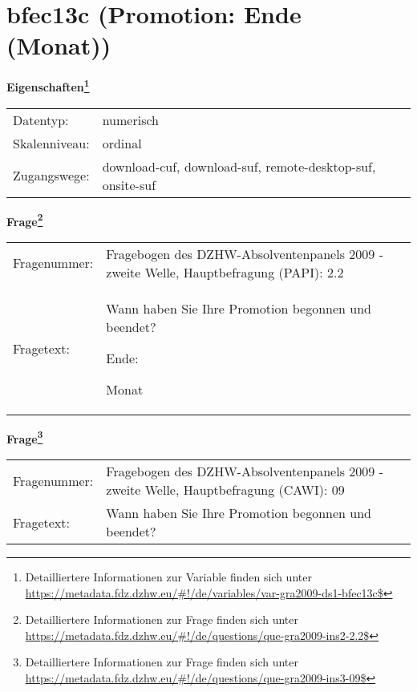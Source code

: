 
    \setcounter{footnote}{0}

    \vspace*{-1.8cm}
	\section{bfec13c (Promotion: Ende (Monat))}
	\label{section:bfec13c}



    \vspace*{0.5cm}
    \noindent\textbf{Eigenschaften\footnote{Detailliertere Informationen zur Variable finden sich unter
		\url{https://metadata.fdz.dzhw.eu/\#!/de/variables/var-gra2009-ds1-bfec13c$}}}\\
	\begin{tabularx}{\hsize}{@{}lX}
	Datentyp: & numerisch \\
	Skalenniveau: & ordinal \\
	Zugangswege: &
	  download-cuf, 
	  download-suf, 
	  remote-desktop-suf, 
	  onsite-suf
 \\
    \end{tabularx}



				\vspace*{0.5cm}
                \noindent\textbf{Frage\footnote{Detailliertere Informationen zur Frage finden sich unter
		              \url{https://metadata.fdz.dzhw.eu/\#!/de/questions/que-gra2009-ins2-2.2$}}}\\
				\begin{tabularx}{\hsize}{@{}lX}
					Fragenummer: &
					  Fragebogen des DZHW-Absolventenpanels 2009 - zweite Welle, Hauptbefragung (PAPI):
					  2.2
 \\
					Fragetext: & Wann haben Sie Ihre Promotion begonnen und beendet?\par  Ende:\par  Monat \\
				\end{tabularx}
				\vspace*{0.5cm}
                \noindent\textbf{Frage\footnote{Detailliertere Informationen zur Frage finden sich unter
		              \url{https://metadata.fdz.dzhw.eu/\#!/de/questions/que-gra2009-ins3-09$}}}\\
				\begin{tabularx}{\hsize}{@{}lX}
					Fragenummer: &
					  Fragebogen des DZHW-Absolventenpanels 2009 - zweite Welle, Hauptbefragung (CAWI):
					  09
 \\
					Fragetext: & Wann haben Sie Ihre Promotion begonnen und beendet? \\
				\end{tabularx}





